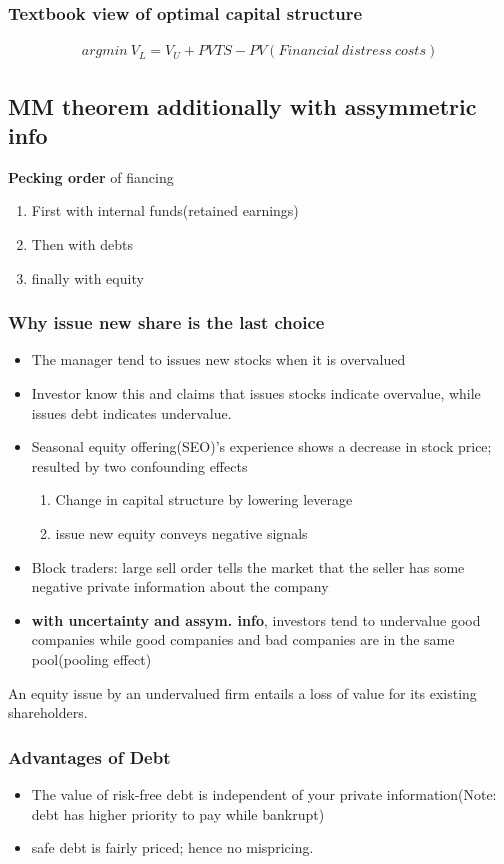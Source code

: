 \documentclass{article}
\theoremstyle{definition}
\theoremstyle{thrm}
\theoremstyle{lma}
\theoremstyle{ppst}
\theoremstyle{crlr}
\begin{document}
\subsubsection{Textbook view of optimal capital structure}
\begin{align*}
	argmin\ V_L = V_U + PVTS - PV(Financial\ distress \ costs)
\end{align*}

\subsection{MM theorem additionally with assymmetric info}
\textbf{Pecking order} of fiancing
\begin{enumerate}
	\item First with internal funds(retained earnings)
	\item Then with debts
	\item finally with equity
\end{enumerate}
\subsubsection{Why issue new share is the last choice}
\begin{itemize}
	\item The manager tend to issues new stocks when it is overvalued
	\item Investor know this and claims that issues stocks indicate overvalue, while issues debt indicates undervalue.
	\item Seasonal equity offering(SEO)'s experience shows a decrease in stock price; resulted by two confounding effects
	\begin{enumerate}
		\item Change in capital structure by lowering leverage
		\item issue new equity conveys negative signals
	\end{enumerate}
	\item Block traders: large sell order tells the market that the seller has some negative private information about the company
	\item \textbf{with uncertainty and assym. info}, investors tend to undervalue good companies while good companies and bad companies are in the same pool(pooling effect)
\end{itemize}
An equity issue by an undervalued firm entails a loss of value for its existing shareholders.

\subsubsection{Advantages of Debt}
\begin{itemize}
	\item The value of risk-free debt is independent of your private information(Note: debt has higher priority to pay while bankrupt)
	\item safe debt is fairly priced; hence no mispricing. 
\end{itemize}
\end{document}
